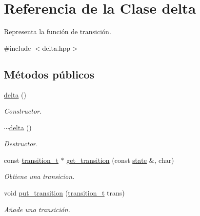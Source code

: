 \hypertarget{classdelta}{}\section{Referencia de la Clase delta}
\label{classdelta}


Representa la función de transición.  




{\ttfamily \#include $<$delta.\+hpp$>$}

\subsection*{Métodos públicos}
\begin{DoxyCompactItemize}
\item 
\hypertarget{classdelta_a435f658a4e7efcf415b8b5c0c719ebc2}{}\hyperlink{classdelta_a435f658a4e7efcf415b8b5c0c719ebc2}{delta} ()\label{classdelta_a435f658a4e7efcf415b8b5c0c719ebc2}

\begin{DoxyCompactList}\small\item\em Constructor. \end{DoxyCompactList}\item 
\hypertarget{classdelta_ae8501f76d2bd17cce5a65b89b82a6ed0}{}\hyperlink{classdelta_ae8501f76d2bd17cce5a65b89b82a6ed0}{$\sim$delta} ()\label{classdelta_ae8501f76d2bd17cce5a65b89b82a6ed0}

\begin{DoxyCompactList}\small\item\em Destructor. \end{DoxyCompactList}\item 
const \hyperlink{classtransition__t}{transition\+\_\+t} $\ast$ \hyperlink{classdelta_acc97ce2edf223c7d487154de2960a798}{get\+\_\+transition} (const \hyperlink{classstate}{state} \&, char)
\begin{DoxyCompactList}\small\item\em Obtiene una transicion. \end{DoxyCompactList}\item 
void \hyperlink{classdelta_afd3d79eb267b4bff4e73c96a2f0efe78}{put\+\_\+transition} (\hyperlink{classtransition__t}{transition\+\_\+t} trans)
\begin{DoxyCompactList}\small\item\em Añade una transición. \end{DoxyCompactList}\end{DoxyCompactItemize}

